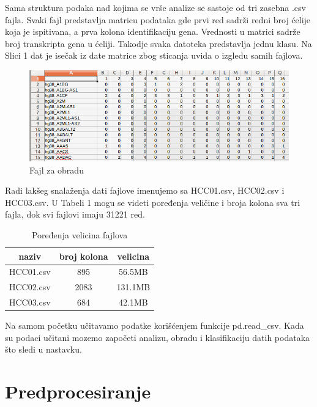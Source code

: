 \documentclass[14pt]{extarticle}
\begin{document}
 Sama struktura podaka nad kojima se vrše analize se sastoje od tri zasebna .csv fajla. Svaki fajl predstavlja matricu podataka gde prvi red sadrži redni broj ćelije koja je ispitivana, a prva kolona identifikaciju gena. Vrednosti u matrici sadrže broj transkripta gena  u ćeliji. Takodje svaka datoteka predstavlja jednu klasu. Na Slici 1 dat je isečak iz date matrice zbog sticanja uvida o izgledu samih fajlova.
 
\begin{figure}[h!]
\begin{center}
\includegraphics[scale=1.5]{slika1.jpg}
\end{center}
\caption{Fajl za obradu}
\label{fig:pande}
\end{figure}

Radi lakšeg snalaženja dati fajlove imenujemo sa HCC01.csv, HCC02.csv i HCC03.csv. U Tabeli 1 mogu se videti poređenja veličine i broja kolona sva tri fajla, dok svi fajlovi imaju 31221 red.

\begin{table}[h!]
\begin{center}
\caption{ Poređenja velicina fajlova }
\begin{tabular}{|c|c|c|} \hline
naziv& broj kolona&  velicina\\ \hline
HCC01.csv& 895 &56.5MB\\ \hline
HCC02.csv&2083 &131.1MB\\ \hline
HCC03.csv&684 &42.1MB\\ \hline\end{tabular}
\label{tab:tabela1}
\end{center}
\end{table}



Na samom početku učitavamo podatke korišćenjem funkcije pd.read\_csv. Kada su podaci učitani mozemo započeti analizu, obradu i klasifikaciju datih podataka što sledi u nastavku.

\section{Predprocesiranje}	
\label{sec:termini_i_citiranje}
\end{document}
